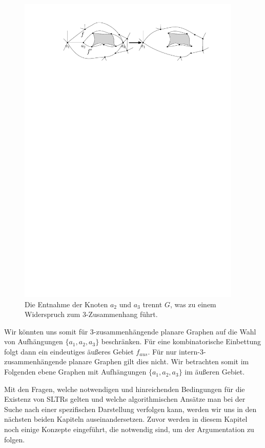 \begin{figure}
	\centering
  \includegraphics[width=0.95\textwidth]{3_conn_uni.pdf}
	\caption{Die Entnahme der Knoten $a_2$ und $a_3$ trennt $G$, was zu einem Widerspruch zum 3-Zusammenhang führt.}
	\label{3_con_uni}
\end{figure}

\begin{remark}
Wir könnten uns somit für 3-zusammenhängende planare Graphen auf die Wahl von Aufhängungen $\{a_1,a_2,a_3\}$ beschränken. Für eine kombinatorische Einbettung folgt dann ein eindeutiges äußeres Gebiet $f_{aus}$. Für nur intern-3-zusammenhängende planare Graphen gilt dies nicht. Wir betrachten somit im Folgenden ebene Graphen mit Aufhängungen $\{a_1,a_2,a_3\}$ im äußeren Gebiet.
\end{remark}

Mit den Fragen, welche notwendigen und hinreichenden Bedingungen für die Existenz von SLTRs gelten und welche algorithmischen Ansätze man bei der Suche nach einer spezifischen Darstellung verfolgen kann, werden wir uns in den nächsten beiden Kapiteln auseinandersetzen. Zuvor werden in diesem Kapitel noch einige Konzepte eingeführt, die notwendig sind, um der Argumentation zu folgen.

